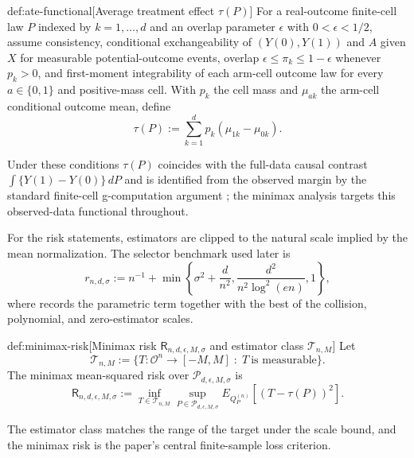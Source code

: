 \documentclass[11pt]{article}
\begin{document}
\begin{definitionv}{def:ate-functional}[Average treatment effect \(\tau(P)\)]
For a real-outcome finite-cell law \(P\) indexed by \(k=1,\ldots,d\) and an overlap parameter \(\epsilon\) with \(0<\epsilon<1/2\), assume consistency, conditional exchangeability of \((Y(0),Y(1))\) and \(A\) given \(X\) for measurable potential-outcome events, overlap \(\epsilon\le \pi_k\le 1-\epsilon\) whenever \(p_k>0\), and first-moment integrability of each arm-cell outcome law for every \(a\in\{0,1\}\) and positive-mass cell. With \(p_k\) the cell mass and \(\mu_{ak}\) the arm-cell conditional outcome mean, define
\[
\tau(P)
:=
\sum_{k=1}^{d}p_k(\mu_{1k}-\mu_{0k}).
\]
\end{definitionv}

Under these conditions \(\tau(P)\) coincides with the full-data causal contrast \(\int\{Y(1)-Y(0)\}\,dP\) and is identified from the observed margin by the standard finite-cell g-computation argument \citep{Rubin1974,RosenbaumRubin1983,Robins1994,ImbensRubin2015}; the minimax analysis targets this observed-data functional throughout.

For the risk statements, estimators are clipped to the natural scale implied by the mean normalization. The selector benchmark used later is
\[
r_{n,d,\sigma}
:=
n^{-1}
+
\min\left\{
\sigma^2+\frac{d}{n^2},
\frac{d^2}{n^2\log^2(en)},
1
\right\},
\]
where  records the parametric term together with the best of the collision, polynomial, and zero-estimator scales.

\begin{definitionv}{def:minimax-risk}[Minimax risk \(\mathsf R_{n,d,\epsilon,M,\sigma}\) and estimator class \(\mathcal T_{n,M}\)]
Let
\[
\mathcal T_{n,M}
:=
\bigl\{
T:\mathcal O^n\to[-M,M]\;:\;T\ \text{is measurable}
\bigr\}.
\]
The minimax mean-squared risk over \(\mathcal P_{d,\epsilon,M,\sigma}\) is
\[
\mathsf R_{n,d,\epsilon,M,\sigma}
:=
\inf_{T\in\mathcal T_{n,M}}
\sup_{P\in\mathcal P_{d,\epsilon,M,\sigma}}
E_{Q_P^{(n)}}\!\left[(T-\tau(P))^2\right].
\]
\end{definitionv}

The estimator class  matches the range of the target under the scale bound, and the minimax risk  is the paper's central finite-sample loss criterion.
\end{document}
